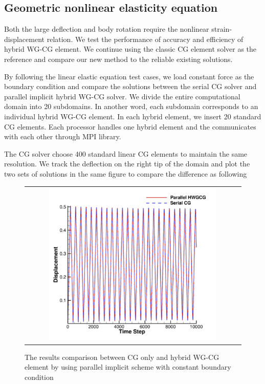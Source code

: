  \subsection{Geometric nonlinear elasticity equation}
 
 Both the large deflection and body rotation require the nonlinear strain-displacement relation. We test the performance of accuracy and efficiency of hybrid WG-CG element. We continue using the classic CG element solver as the reference and compare our new method to the reliable existing solutions.
 
 By following the linear elastic equation test cases, we load constant force as the boundary condition and compare the solutions between the serial CG solver and parallel implicit hybrid WG-CG solver. We divide the entire computational domain into 20 subdomains. In another word, each subdomain corresponds to an individual hybrid WG-CG element. In each hybrid element, we insert 20 standard CG elements. Each processor handles one hybrid element and the communicates with each other through MPI library. 
 
 The CG solver choose 400 standard linear CG elements to maintain the same resolution. We track the deflection on the right tip of the domain and plot the two sets of solutions in the same figure to compare the difference as following
 
  \begin{figure}[H]
  	\centering
  	\begin{tabular}{c}
  		\includegraphics[width=0.8\textwidth]{./pics/result1d4.png}
  	\end{tabular}
  	\caption{\footnotesize The results comparison between CG only and hybrid WG-CG element by using parallel implicit scheme with constant boundary condition}
  \end{figure}
  

